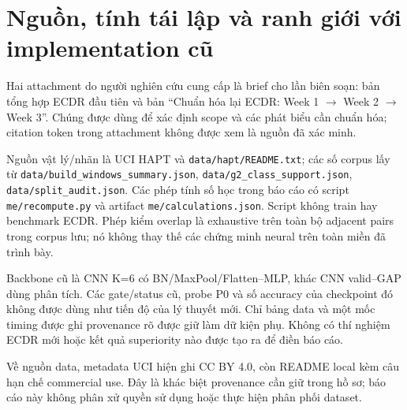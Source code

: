 \documentclass[11pt,a4paper]{article}
\newcommand{\code}[1]{{\small\ttfamily\nolinkurl{#1}}}
\theoremstyle{remark}
\begin{document}
\clearpage
\appendix
\section{Nguồn, tính tái lập và ranh giới với implementation cũ}
Hai attachment do người nghiên cứu cung cấp là brief cho lần biên soạn:
bản tổng hợp ECDR đầu tiên và bản ``Chuẩn hóa lại ECDR: Week 1 $\to$ Week 2
$\to$ Week 3''. Chúng được dùng để xác định scope và các phát biểu cần
chuẩn hóa; citation token trong attachment không được xem là nguồn đã xác minh.

Nguồn vật lý/nhãn là UCI HAPT và \code{data/hapt/README.txt}; các số corpus
lấy từ \code{data/build_windows_summary.json},
\code{data/g2_class_support.json}, \code{data/split_audit.json}.
Các phép tính số học trong báo cáo có script \code{me/recompute.py} và
artifact \code{me/calculations.json}. Script không train hay benchmark ECDR.
Phép kiểm overlap là exhaustive trên toàn bộ adjacent pairs trong corpus
lưu; nó không thay thế các chứng minh neural trên toàn miền đã trình bày.

Backbone cũ là CNN K=6 có BN/MaxPool/Flatten--MLP, khác CNN valid--GAP dùng
phân tích. Các gate/status cũ, probe P0 và số accuracy của checkpoint đó
không được dùng như tiến độ của lý thuyết mới. Chỉ bảng data và một mốc
timing được ghi provenance rõ được giữ làm dữ kiện phụ. Không có thí nghiệm
ECDR mới hoặc kết quả superiority nào được tạo ra để điền báo cáo.

Về nguồn data, metadata UCI hiện ghi CC BY 4.0, còn README local kèm câu
hạn chế commercial use. Đây là khác biệt provenance cần giữ trong hồ sơ;
báo cáo này không phân xử quyền sử dụng hoặc thực hiện phân phối dataset.
\end{document}
